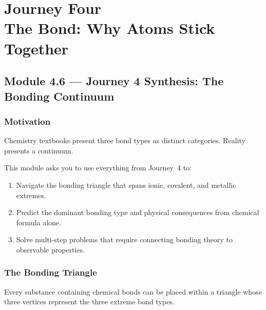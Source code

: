 \documentclass[12pt, a4paper]{book}
\begin{document}
\setcounter{chapter}{3}
\chapter[Journey 4 --- The Bond]{Journey Four\\[8pt]
  \textcolor{ModuleColor}{\large The Bond: Why Atoms Stick Together}}
\setcounter{section}{5}

\section{Module 4.6 --- Journey 4 Synthesis: The Bonding Continuum}

\subsection*{Motivation}

Chemistry textbooks present three bond types as distinct categories.
Reality presents a continuum.

This module asks you to use everything from Journey~4 to:
\begin{enumerate}[nosep, leftmargin=2em]
  \item Navigate the bonding triangle that spans ionic,
        covalent, and metallic extremes.
  \item Predict the dominant bonding type and physical
        consequences from chemical formula alone.
  \item Solve multi-step problems that require connecting
        bonding theory to observable properties.
\end{enumerate}

\subsection{The Bonding Triangle}

Every substance containing chemical bonds can be placed
within a triangle whose three vertices represent
the three extreme bond types.
\end{document}
